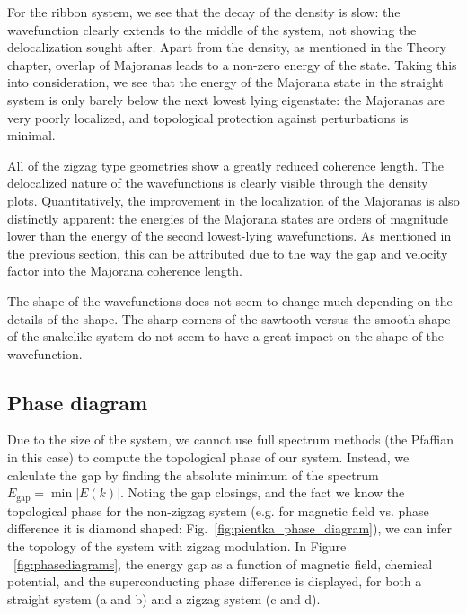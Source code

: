 			For the ribbon system, we see that the decay of the density is slow: the wavefunction clearly extends to the middle of the system, not showing the delocalization sought after.
			Apart from the density, as mentioned in the Theory chapter, overlap of Majoranas leads to a non-zero energy of the state.
			Taking this into consideration, we see that the energy of the Majorana state in the straight system is only barely below the next lowest lying eigenstate: the Majoranas are very poorly localized, and topological protection against perturbations is minimal.
			
			All of the zigzag type geometries show a greatly reduced coherence length.
			The delocalized nature of the wavefunctions is clearly visible through the density plots.
			Quantitatively, the improvement in the localization of the Majoranas is also distinctly apparent: the energies of the Majorana states are orders of magnitude lower than the energy of the second lowest-lying wavefunctions.
			As mentioned in the previous section, this can be attributed due to the way the gap and velocity factor into the Majorana coherence length.

			The shape of the wavefunctions does not seem to change much depending on the details of the shape.
			The sharp corners of the sawtooth versus the smooth shape of the snakelike system do not seem to have a great impact on the shape of the wavefunction.


		\subsection{Phase diagram}

			Due to the size of the system, we cannot use full spectrum methods (the Pfaffian in this case) to compute the topological phase of our system.
			Instead, we calculate the gap by finding the absolute minimum of the spectrum $E_\textrm{gap}=\min{|E(k)|}$.
			Noting the gap closings, and the fact we know the topological phase for the non-zigzag system (e.g. for magnetic field vs. phase difference it is diamond shaped: Fig.~\ref{fig:pientka_phase_diagram}), we can infer the topology of the system with zigzag modulation.
			In Figure ~\ref{fig:phasediagrams}, the energy gap as a function of magnetic field, chemical potential, and the superconducting phase difference is displayed, for both a straight system (a and b) and a zigzag system (c and d).

